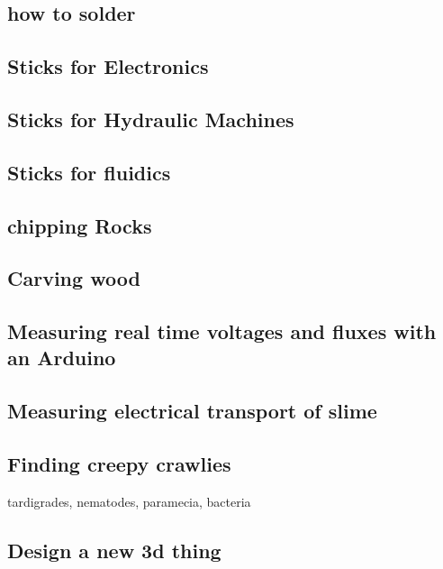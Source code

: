 \subsection{how to solder}\label{how-to-solder}

\subsection{Sticks for Electronics}\label{sticks-for-electronics}

\subsection{Sticks for Hydraulic
Machines}\label{sticks-for-hydraulic-machines}

\subsection{Sticks for fluidics}\label{sticks-for-fluidics}

\subsection{chipping Rocks}\label{chipping-rocks}

\subsection{Carving wood}\label{carving-wood}

\subsection{Measuring real time voltages and fluxes with an
Arduino}\label{measuring-real-time-voltages-and-fluxes-with-an-arduino}

\subsection{Measuring electrical transport of
slime}\label{measuring-electrical-transport-of-slime}

\subsection{Finding creepy crawlies}\label{finding-creepy-crawlies}

tardigrades, nematodes, paramecia, bacteria

\subsection{Design a new 3d thing}\label{design-a-new-3d-thing}

